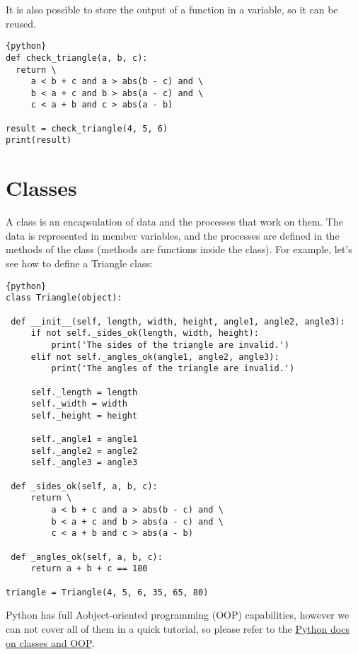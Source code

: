 It is also possible to store the output of a function in a variable, so
it can be reused.

\begin{lstlisting}{python}
def check_triangle(a, b, c):
  return \
     a < b + c and a > abs(b - c) and \
     b < a + c and b > abs(a - c) and \
     c < a + b and c > abs(a - b)

result = check_triangle(4, 5, 6)
print(result)
\end{lstlisting}

\section{Classes}\label{classes}

A class is an encapsulation of data and the processes that work on them.
The data is represented in member variables, and the processes are
defined in the methods of the class (methods are functions inside the
class). For example, let's see how to define a Triangle class:

\begin{lstlisting}{python}
class Triangle(object):

 def __init__(self, length, width, height, angle1, angle2, angle3):
     if not self._sides_ok(length, width, height):
         print('The sides of the triangle are invalid.')
     elif not self._angles_ok(angle1, angle2, angle3):
         print('The angles of the triangle are invalid.')

     self._length = length
     self._width = width
     self._height = height

     self._angle1 = angle1
     self._angle2 = angle2
     self._angle3 = angle3

 def _sides_ok(self, a, b, c):
     return \
         a < b + c and a > abs(b - c) and \
         b < a + c and b > abs(a - c) and \
         c < a + b and c > abs(a - b)

 def _angles_ok(self, a, b, c):
     return a + b + c == 180

triangle = Triangle(4, 5, 6, 35, 65, 80)
\end{lstlisting}

Python has full Aobject-oriented programming (OOP) capabilities, however
we can not cover all of them in a quick tutorial, so please refer to the
\href{https://docs.python.org/2.7/tutorial/classes.html}{Python docs on
classes and OOP}.
